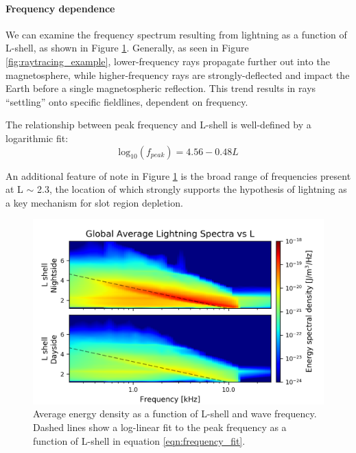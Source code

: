 \paragraph{Frequency dependence}
We can examine the frequency spectrum resulting from lightning as a function of L-shell, as shown in Figure \ref{fig:energy_density_vs_L_vs_freq}. Generally, as seen in Figure \ref{fig:raytracing_example}, lower-frequency rays propagate further out into the magnetosphere, while higher-frequency rays are strongly-deflected and impact the Earth before a single magnetospheric reflection. This trend results in rays ``settling'' onto specific fieldlines, dependent on frequency.

The relationship between peak frequency and L-shell is well-defined by a logarithmic fit:
\begin{equation}
\label{eqn:frequency_fit}
\mathrm{log}_{10}(f_{peak}) = 4.56 - 0.48 L
\end{equation}

An additional feature of note in Figure \ref{fig:energy_density_vs_L_vs_freq} is the broad range of frequencies present at L $\sim$ 2.3, the location of which strongly supports the hypothesis of lightning as a key mechanism for slot region depletion. 
\begin{figure}[hb]
\begin{center}
\includegraphics{figures/lightning_spectra_vs_L_logscale.png}
\caption[Average energy density vs L and frequency]{Average energy density as a function of L-shell and wave frequency. Dashed lines show a log-linear fit to the peak frequency as a function of L-shell in equation \eqref{eqn:frequency_fit}.}
\label{fig:energy_density_vs_L_vs_freq}
\end{center}
\end{figure}











